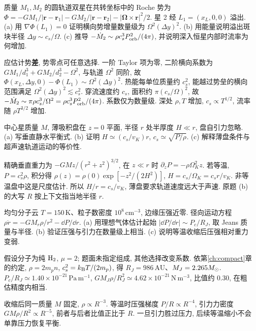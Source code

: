 \begin{exercise}
质量 $M_1,M_2$ 的圆轨道双星在共转坐标中的 Roche 势为 $\Phi=-GM_1/|\boldsymbol r-\boldsymbol r_1|-GM_2/|\boldsymbol r-\boldsymbol r_2|-|\boldsymbol\Omega\times\boldsymbol r|^2/2$. 星 2 经 $L_1=(x_L,0,0)$ 溢出.
(a) 用 $\nabla\Phi(L_1)=0$ 证明横向势增量数量级为 $\Omega^2(\Delta y)^2$.
(b) 用能量说明溢出斑块半径 $\Delta y\sim c_s/\Omega$.
(c) 推导 $-\dot M_2\sim\rho c_s^3P_{\rm orb}^2/(4\pi)$, 并说明深入恒星内部时流率为何增加.
\end{exercise}
\begin{solution}
应估计势\textbf{差}, 势零点可任意选择. 一阶 Taylor 项为零, 二阶横向系数为 $GM_1/d_1^3+GM_2/d_2^3-\Omega^2$, 与轨道 $\Omega^2$ 同阶, 故 $\Phi(x_L,\Delta y,0)-\Phi(L_1)\sim\Omega^2(\Delta y)^2$. 热能每单位质量约 $c_s^2$, 能越过势垒的横向范围满足 $\Omega^2(\Delta y)^2\lesssim c_s^2$. 穿流速度约 $c_s$, 面积约 $\pi(c_s/\Omega)^2$, 故 $-\dot M_2\sim\pi\rho c_s^3/\Omega^2=\rho c_s^3P_{\rm orb}^2/(4\pi)$. 系数仅为数量级. 深处 $\rho,T$ 增加, $c_s\propto T^{1/2}$, 流率随 $\rho T^{3/2}$ 增加.
\end{solution}

\begin{exercise}
中心星质量 $M$, 薄吸积盘在 $z=0$ 平面, 半径 $r$ 处半厚度 $H\ll r$, 盘自引力忽略.
(a) 写垂直静水平衡式.
(b) 证明 $H\simeq(c_s/v_K)r$, $c_s\simeq\sqrt{P/\rho}$.
(c) 解释薄盘条件与超声速轨道运动的等价性.
\end{exercise}
\begin{solution}
精确垂直重力为 $-GMz/(r^2+z^2)^{3/2}$, 在 $z\ll r$ 时 $\partial_zP=-\rho\Omega_K^2z$. 若等温, $P=c_s^2\rho$, 积分得 $\rho(z)=\rho(0)\exp[-z^2/(2H^2)]$, $H=c_s/\Omega_K=c_sr/v_K$. 非等温盘中这是尺度估计. 所以 $H/r=c_s/v_K$, 薄盘要求轨道速度远大于声速. 原题 (b) 的大写 $R$ 按上下文指当地半径 $r$.
\end{solution}

\begin{exercise}
均匀分子云 $T=150\,\mathrm K$、粒子数密度 $10^8\,\mathrm{cm^{-3}}$, 边缘压强近零. 径向运动方程 $\rho\ddot r=-GM_r\rho/r^2-\dd P/\dd r$.
(a) 用理想气体估计起始 $|\dd P/\dd r|\sim P_c/R_J$, 取 Jeans 质量与半径.
(b) 验证压强与引力在数量级上相当.
(c) 说明等温收缩后压强相对重力变弱.
\end{exercise}
\begin{solution}
假设分子为纯 ${\rm H}_2$, $\mu=2$; 题面未指定组成, 其他选择改变系数. 依第\ref{ch:compact}章的约定, $\rho=2m_pn$, $c_s^2=k_{\mathrm B} T/(2m_p)$, 得 $R_J=986\,\mathrm{AU}$、$M_J=2.265M_{\odot}$. $P_c/R_J\simeq1.40\times10^{-21}\,\mathrm{Pa\,m^{-1}}$, $GM_J\rho/R_J^2\simeq4.62\times10^{-21}\,\mathrm{N\,m^{-3}}$, 比值约 $0.30$, 在粗估精度内相当.

收缩后同一质量 $M$ 固定, $\rho\propto R^{-3}$. 等温时压强梯度 $P/R\propto R^{-4}$, 引力力密度 $GM\rho/R^2\propto R^{-5}$, 前者与后者比值正比于 $R$. 一旦引力胜过压力, 后续等温缩小不会单靠压力恢复平衡.
\end{solution}

